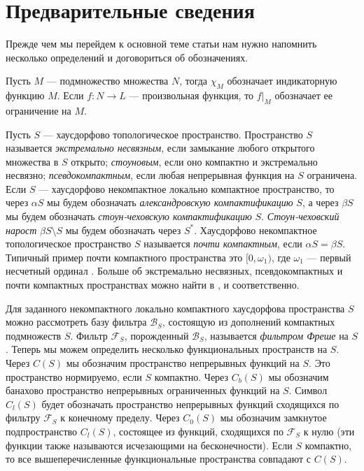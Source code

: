 \documentclass[12pt]{article}
\begin{document}

\section{Предварительные сведения}
\label{SectionPreliminaries}
Прежде чем мы перейдем к основной теме статьи нам нужно напомнить несколько определений и договориться об обозначениях.

Пусть $M$ ---  подмножество множества $N$, тогда $\chi_M$ обозначает индикаторную функцию $M$. Если $f:N\to L$ --- произвольная функция, то $f|_M$ обозначает ее ограничение на $M$.

Пусть $S$ ---  хаусдорфово топологическое пространство. Пространство $S$ называется \textit{экстремально несвязным}, если замыкание любого открытого множества в $S$ открыто; \textit{стоуновым}, если оно компактно и экстремально несвязно; \textit{псевдокомпактным}, если любая непрерывная функция на $S$ ограничена. Если $S$ --- хаусдорфово некомпактное локально компактное пространство, то через $\alpha S$ мы будем обозначать \textit{александровскую компактификацию} $S$, а через $\beta S$ мы будем обозначать \textit{стоун-чеховскую компактификацию} $S$. \textit{Стоун-чеховский нарост} $\beta S\setminus S$ мы будем обозначать через $S^*$. Хаусдорфово некомпактное топологическое пространство $S$ называется \textit{почти компактным}, если $\alpha S=\beta S$. Типичный пример почти компактного пространства это $[0, \omega_1)$, где $\omega_1$ --- первый несчетный ординал \cite[глава 1.3]{HrusPsdCompTopSp}. Больше об экстремально несвязных, псевдокомпактных и почти компактных пространствах можно найти в \cite[раздел 6.2]{EngkingGenTop}, \cite[раздел 3.10]{EngkingGenTop} и \cite[глава 1.3]{HrusPsdCompTopSp} соответственно.

Для заданного некомпактного локально компактного хаусдорфова пространства $S$ можно рассмотреть базу фильтра $\mathcal{B}_S$, состоящую из дополнений компактных подмножеств $S$. Фильтр $\mathcal{F}_S$, порожденный $\mathcal{B}_S$, называется \textit{фильтром Фреше} на $S$. Теперь мы можем определить несколько функциональных пространств на $S$.  Через $C(S)$ мы обозначим пространство непрерывных функций на $S$. Это пространство нормируемо, если $S$ компактно. Через $C_b(S)$ мы обозначим банахово пространство непрерывных ограниченных функций на $S$. Символ $C_l(S)$ будет обозначать пространство непрерывных функций сходящихся по фильтру $\mathcal{F}_S$ к конечному пределу. Через $C_0(S)$ мы обозначим замкнутое подпространство $C_l(S)$, состоящее из функций, сходящихся по $\mathcal{F}_S$ к нулю (эти функции также называются исчезающими на бесконечности). Если $S$ компактно, то все вышеперечисленные функциональные пространства совпадают с $C(S)$.
\end{document}
